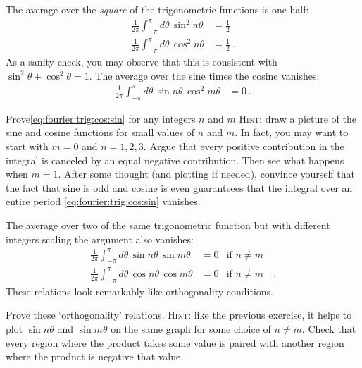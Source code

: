 \documentclass[12pt, oneside]{report}    %
\begin{document}
The average over the \emph{square} of the trigonometric functions is one half:
\begin{align}
    \frac{1}{2\pi}
    \int_{-\pi}^\pi d\theta\, \sin^2 n\theta 
    &= \frac{1}{2}
    \\
    \frac{1}{2\pi}
    \int_{-\pi}^\pi d\theta\, \cos^2 n\theta 
    &= \frac{1}{2} \ .
\end{align}
As a sanity check, you may observe that this is consistent with $\sin^2 \theta + \cos^2\theta = 1$.
The average over the sine times the cosine vanishes:
\begin{align}
    \frac{1}{2\pi}
    \int_{-\pi}^\pi d\theta\, \sin n\theta \, \cos^2 m\theta 
    &= 0 \ .
    \label{eq:fourier:trig:cos:sin}
\end{align}
\begin{exercise}
Prove\sidenotemark \eqref{eq:fourier:trig:cos:sin} for any integers $n$ and $m$ \textsc{Hint}: draw a picture of the sine and cosine functions for small values of $n$ and $m$. In fact, you may want to start with $m=0$ and $n=1,2,3$. Argue that every positive contribution in the integral is canceled by an equal negative contribution. Then see what happens when $m=1$. After some thought (and plotting if needed), convince yourself that the fact that sine is odd and cosine is even guaranteees that the integral over an entire period \eqref{eq:fourier:trig:cos:sin} vanishes.
\end{exercise}
The average over two of the same trigonometric function but with different integers scaling the argument also vanishes:
\begin{align}
    \frac{1}{2\pi}
    \int_{-\pi}^\pi d\theta\, \sin n\theta \,\sin m\theta 
    &= 0
    &
    \text{if }n\neq m&
    \\
    \frac{1}{2\pi}
    \int_{-\pi}^\pi d\theta\, \cos n\theta \,\cos m\theta 
    &= 0 
    &
    \text{if }n\neq m&
    \ .
\end{align}
These relations look remarkably like orthogonality conditions. 
\begin{exercise}
Prove these `orthogonality' relations. \textsc{Hint}: like the previous exercise, it helps to plot $\sin n\theta$ and $\sin m\theta$ on the same graph for some choice of $n\neq m$. Check that every region where the product takes some value is paired with another region where the product is negative that value.
\end{exercise}
\end{document}
